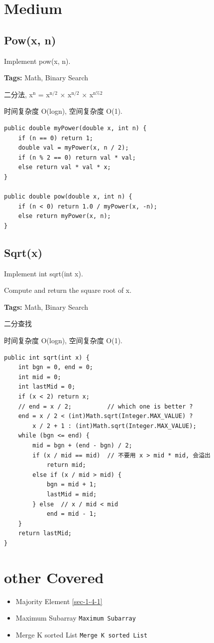 \documentclass[12pt]{book}
\begin{document}
\section{Medium}
\label{sec-12-1}
\subsection{Pow(x, n)}
\label{sec-12-1-1}
Implement pow(x, n).

\textbf{Tags:} Math, Binary Search

二分法, x$^{\text{n}}$ = x$^{\text{n/2}}$ × x$^{\text{n/2}}$ × x$^{\text{n\%2}}$

时间复杂度 O(logn), 空间复杂度 O(1).
\lstset{language=java,label= ,caption= ,numbers=none}
\begin{lstlisting}
public double myPower(double x, int n) {
    if (n == 0) return 1;
    double val = myPower(x, n / 2);
    if (n % 2 == 0) return val * val;
    else return val * val * x;
}
        
public double pow(double x, int n) {
    if (n < 0) return 1.0 / myPower(x, -n);
    else return myPower(x, n);
}
\end{lstlisting}

\subsection{Sqrt(x)}
\label{sec-12-1-2}
Implement int sqrt(int x).

Compute and return the square root of x.

\textbf{Tags:} Math, Binary Search

二分查找

时间复杂度 O(logn), 空间复杂度 O(1).
\lstset{language=java,label= ,caption= ,numbers=none}
\begin{lstlisting}
public int sqrt(int x) {
    int bgn = 0, end = 0;
    int mid = 0;
    int lastMid = 0;
    if (x < 2) return x;
    // end = x / 2;          // which one is better ?
    end = x / 2 < (int)Math.sqrt(Integer.MAX_VALUE) ?
        x / 2 + 1 : (int)Math.sqrt(Integer.MAX_VALUE);
    while (bgn <= end) {
        mid = bgn + (end - bgn) / 2;
        if (x / mid == mid)  // 不要用 x > mid * mid, 会溢出
            return mid;
        else if (x / mid > mid) {
            bgn = mid + 1;
            lastMid = mid;
        } else  // x / mid < mid
            end = mid - 1;
    }
    return lastMid;
}
\end{lstlisting}

\section{other Covered}
\label{sec-12-2}
\begin{itemize}
\item Majority Element
\ref{sec-1-4-1}
\item Maximum Subarray
\texttt{Maximum Subarray}
\item Merge K sorted List
\texttt{Merge K sorted List}
\end{itemize}
\end{document}
